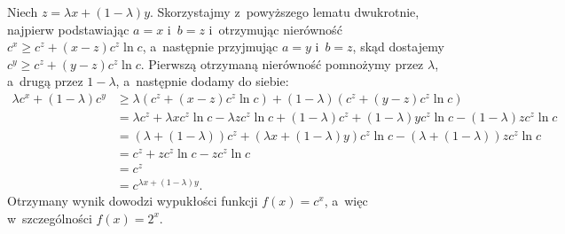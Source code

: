 Niech $z=\lambda x+(1-\lambda)y$.
Skorzystajmy z~powyższego lematu dwukrotnie, najpierw podstawiając $a=x$ i~$b=z$ i~otrzymując nierówność $c^x\ge c^z+(x-z)c^z\ln c$, a~następnie przyjmując $a=y$ i~$b=z$, skąd dostajemy $c^y\ge c^z+(y-z)c^z\ln c$.
Pierwszą otrzymaną nierówność pomnożymy przez $\lambda$, a~drugą przez $1-\lambda$, a~następnie dodamy do siebie:
\begin{align*}
	\lambda c^x+(1-\lambda)c^y &\ge \lambda(c^z+(x-z)c^z\ln c)+(1-\lambda)(c^z+(y-z)c^z\ln c) \\
	&= \lambda c^z+\lambda xc^z\ln c-\lambda zc^z\ln c+(1-\lambda)c^z+(1-\lambda)yc^z\ln c-(1-\lambda)zc^z\ln c \\
	&= (\lambda+(1-\lambda))c^z+(\lambda x+(1-\lambda)y)c^z\ln c-(\lambda+(1-\lambda))zc^z\ln c \\
	&= c^z+zc^z\ln c-zc^z\ln c \\
	&= c^z \\
	&= c^{\lambda x+(1-\lambda)y}.
\end{align*}
Otrzymany wynik dowodzi wypukłości funkcji $f(x)=c^x$, a~więc w~szczególności $f(x)=2^x$.

\exercise %

\problems


\subproblem %
\subproblem %
\subproblem %
\subproblem %



\subproblem %
\subproblem %
\subproblem %
\subproblem %
\subproblem %
\subproblem %


\subproblem %
\subproblem %
\subproblem %

\subproblem %

\endinput
